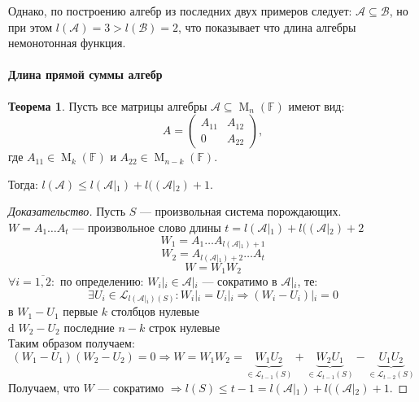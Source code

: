 \documentclass[a4paper, 14pt]{extarticle}
\theoremstyle{definition}
\newtheorem{theorem}{Теорема}
\begin{document}
Однако, по построению алгебр из последних двух примеров следует: \(\mathcal{A} \subseteq \mathcal{B}\), но при этом \(l(\mathcal{A}) = 3 > l(\mathcal{B}) = 2\), что показывает что длина алгебры немонотонная функция.

\paragraph{Длина прямой суммы алгебр}

\begin{theorem}
	Пусть все матрицы алгебры \(\mathcal{A} \subseteq \operatorname{M}_n(\mathbb{F})\) имеют вид:
	\[A = \left( \begin{array}{c|c}
		A_{11} & A_{12} \\
		\hline
		0 & A_{22}
	\end{array} \right), \]
	где \(A_{11} \in \operatorname{M}_k(\mathbb{F})\) и \(A_{22} \in \operatorname{M}_{n - k}(\mathbb{F})\).
	
	Тогда: \(l(\mathcal{A}) \leqslant l(\mathcal{A} \left|_{1} \right.) + l((\mathcal{A} \left|_{2} \right.) + 1\).
\end{theorem}

\begin{proof}[Доказательство]
	Пусть \(S\) --- произвольная система порождающих.\\
	\(W = A_1 \dots A_t\) --- произвольное слово длины \(t = l(\mathcal{A} \left|_{1} \right.) + l((\mathcal{A} \left|_{2} \right.) + 2\)
	\[W_1 = A_1 \dots A_{l(\mathcal{A} \left|_{1} \right.) + 1}\]
	\[W_2 = A_{l(\mathcal{A} \left|_{1} \right.) + 2} \dots A_t\]
	\[W = W_1W_2\]
	\(\forall i = \overline{1, 2} : \) по определению: \(W_{i} \left|_{i} \right. \in \mathcal{A} \left|_{i} \right.\) --- сократимо в \(\mathcal{A} \left|_{i} \right.\), те:
	\[\exists U_i \in \mathcal{L}_{l(\mathcal{A} \left|_{i} \right.) (S)} : W_i \left|_{i} \right. = U_i \left|_{i} \right. \Rightarrow (W_i - U_i) \left|_{i} \right. = 0\]
	в \(W_1 - U_1\) первые \(k\) столбцов нулевые\\
	d \(W_2 - U_2\) последние \(n - k\) строк нулевые\\
	Таким образом получаем:
	\[(W_1 - U_1)(W_2 - U_2) = 0 \Rightarrow W = W_1W_2 = \underbrace{W_1U_2}_{\in \mathcal{L}_{t - 1} (S)} + \underbrace{W_2U_1}_{\in \mathcal{L}_{t - 1} (S)} - \underbrace{U_1U_2}_{\in \mathcal{L}_{t - 2} (S)}\]
	Получаем, что \(W\) --- сократимо \(\Rightarrow l(S) \leqslant t - 1 = l(\mathcal{A} \left|_{1} \right.) + l((\mathcal{A} \left|_{2} \right.) + 1\).
\end{proof}
\end{document}
